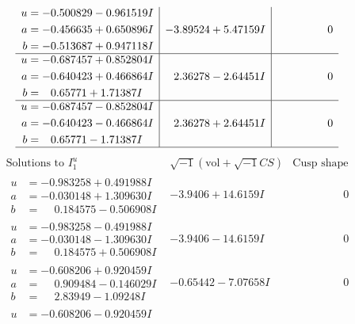 \documentclass[1p]{elsarticle_modified}
\theoremstyle{definition}
\newcommand{\I}{\sqrt{-1}}
\begin{document}
$$\begin{array}{c|c|c}
\begin{aligned}
u &= -0.500829 - 0.961519 I \\
a &= -0.456635 + 0.650896 I \\
b &= -0.513687 + 0.947118 I\end{aligned}
 & -3.89524 + 5.47159 I & \phantom{-0.000000 } 0 \\ \hline\begin{aligned}
u &= -0.687457 + 0.852804 I \\
a &= -0.640423 + 0.466864 I \\
b &= \phantom{-}0.65771 + 1.71387 I\end{aligned}
 & \phantom{-}2.36278 - 2.64451 I & \phantom{-0.000000 } 0 \\ \hline\begin{aligned}
u &= -0.687457 - 0.852804 I \\
a &= -0.640423 - 0.466864 I \\
b &= \phantom{-}0.65771 - 1.71387 I\end{aligned}
 & \phantom{-}2.36278 + 2.64451 I & \phantom{-0.000000 } 0\\
 \hline 
 \end{array}$$\newpage$$\begin{array}{c|c|c}  
\text{Solutions to }I^u_{1}& \I (\text{vol} + \sqrt{-1}CS) & \text{Cusp shape}\\
 \hline 
\begin{aligned}
u &= -0.983258 + 0.491988 I \\
a &= -0.030148 + 1.309630 I \\
b &= \phantom{-}0.184575 - 0.506908 I\end{aligned}
 & -3.9406 + 14.6159 I & \phantom{-0.000000 } 0 \\ \hline\begin{aligned}
u &= -0.983258 - 0.491988 I \\
a &= -0.030148 - 1.309630 I \\
b &= \phantom{-}0.184575 + 0.506908 I\end{aligned}
 & -3.9406 - 14.6159 I & \phantom{-0.000000 } 0 \\ \hline\begin{aligned}
u &= -0.608206 + 0.920459 I \\
a &= \phantom{-}0.909484 - 0.146029 I \\
b &= \phantom{-}2.83949 - 1.09248 I\end{aligned}
 & -0.65442 - 7.07658 I & \phantom{-0.000000 } 0 \\ \hline\begin{aligned}
u &= -0.608206 - 0.920459 I \\

\end{aligned}
\end{array}$$
\end{document}
